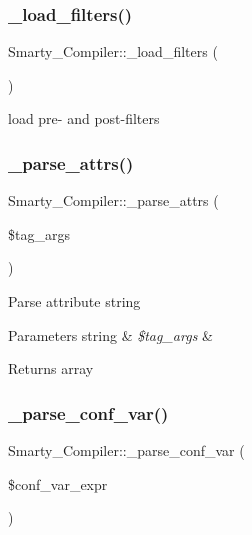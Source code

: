 \subsubsection{\texorpdfstring{\+\_\+load\+\_\+filters()}{\_load\_filters()}}
{\footnotesize\ttfamily Smarty\+\_\+\+Compiler\+::\+\_\+load\+\_\+filters (\begin{DoxyParamCaption}{ }\end{DoxyParamCaption})}

load pre-\/ and post-\/filters \mbox{\label{class_smarty___compiler_a5706e11e1bec434a07ced48e1462507c}} 
\subsubsection{\texorpdfstring{\+\_\+parse\+\_\+attrs()}{\_parse\_attrs()}}
{\footnotesize\ttfamily Smarty\+\_\+\+Compiler\+::\+\_\+parse\+\_\+attrs (\begin{DoxyParamCaption}\item[{}]{\$tag\+\_\+args }\end{DoxyParamCaption})}

Parse attribute string


\begin{DoxyParams}[1]{Parameters}
string & {\em \$tag\+\_\+args} & \\
\hline
\end{DoxyParams}
\begin{DoxyReturn}{Returns}
array 
\end{DoxyReturn}
\mbox{\label{class_smarty___compiler_a5b6479977bec73b8ae0732c2b4f47d16}} 
\subsubsection{\texorpdfstring{\+\_\+parse\+\_\+conf\+\_\+var()}{\_parse\_conf\_var()}}
{\footnotesize\ttfamily Smarty\+\_\+\+Compiler\+::\+\_\+parse\+\_\+conf\+\_\+var (\begin{DoxyParamCaption}\item[{}]{\$conf\+\_\+var\+\_\+expr }\end{DoxyParamCaption})}

